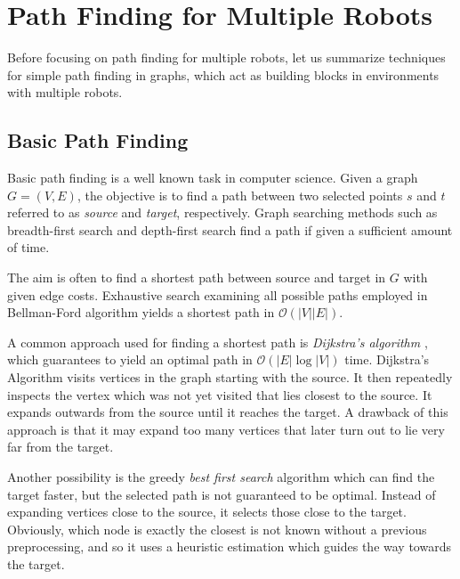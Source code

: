 \chapter{Path Finding for Multiple Robots}\label{sec:app}


Before focusing on path finding for multiple robots, let us summarize techniques for simple path finding in graphs, which act as building blocks in environments with multiple robots.

\section{Basic Path Finding}

Basic path finding is a well known task in computer science.
Given a graph $G=(V,E)$, the objective is to find a path between two selected points $s$ and $t$ referred to as  \emph{source} and \emph{target}, respectively.
Graph searching methods such as breadth-first search and depth-first search find a path if given a sufficient amount of time. 

The aim is often to find a shortest path between source and target in $G$ with given edge costs.
Exhaustive search examining all possible paths employed in Bellman-Ford algorithm yields a shortest path in $\mathcal{O}(|V||E|)$.

A common approach used for finding a shortest path is \emph{Dijkstra's algorithm} \cite{dijkstra59}, which guarantees to yield an optimal path in $\mathcal{O}(|E|\log|V|)$ time.
Dijkstra’s Algorithm visits vertices in the graph starting with the source. 
It then repeatedly inspects the vertex which was not yet visited that lies closest to the source. 
It expands outwards from the source until it reaches the target. 
A drawback of this approach is that it may expand too many vertices that later turn out to lie very far from the target.

Another possibility is the greedy \emph{best first search} algorithm which can find the target faster, but the selected path is not guaranteed to be optimal.
Instead of expanding vertices close to the source, it selects those close to the target.
Obviously, which node is exactly the closest is not known without a previous preprocessing, and so it uses a heuristic estimation which guides the way towards the target.

